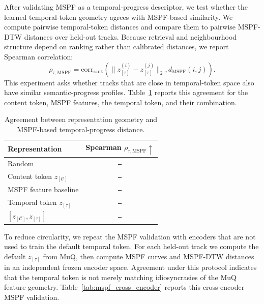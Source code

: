 \documentclass{article}
\newcommand{\zC}{z_{[\mathcal{C}]}}    %
\newcommand{\ztau}{z_{[\tau]}}          %
\newcommand{\res}{\texttt{--}}
\begin{document}
After validating MSPF as a temporal-progress descriptor, we test
whether the learned temporal-token geometry agrees with MSPF-based
similarity.  We compute pairwise temporal-token distances and
compare them to pairwise MSPF-DTW distances over held-out tracks.
Because retrieval and neighbourhood structure depend on ranking
rather than calibrated distances, we report Spearman correlation:
%
\begin{equation}
  \rho_{\tau,\mathrm{MSPF}}
  =
  \mathrm{corr}_{\mathrm{rank}}
  \left(
    \|\ztau^{(i)}-\ztau^{(j)}\|_2,
    d_{\mathrm{MSPF}}(i,j)
  \right).
  \label{eq:mspf_geometry}
\end{equation}
%
This experiment asks whether tracks that are close in temporal-token
space also have similar semantic-progress profiles.
Table~\ref{tab:mspf_geometry} reports this agreement for the
content token, MSPF features, the temporal token, and their
combination.

\begin{table}[t]
  \centering
  \setlength{\tabcolsep}{5.0pt}
  \caption{Agreement between representation geometry and MSPF-based
  temporal-progress distance.}
  \label{tab:mspf_geometry}
  \begin{tabular}{lc}
    \toprule
    \textbf{Representation}
    & Spearman $\rho_{\tau,\mathrm{MSPF}}\uparrow$ \\
    \midrule
    Random & \res \\
    Content token $\zC$ & \res \\
    MSPF feature baseline & \res \\
    Temporal token $\ztau$ & \res \\
    $[\zC,\ztau]$ & \res \\
    \bottomrule
  \end{tabular}
\end{table}

To reduce circularity, we repeat the MSPF validation with encoders
that are not used to train the default temporal token.  For each
held-out track we compute the default $\ztau$ from MuQ, then compute
MSPF curves and MSPF-DTW distances in an independent frozen encoder
space.  Agreement under this protocol indicates that the temporal
token is not merely matching idiosyncrasies of the MuQ feature
geometry.  Table~\ref{tab:mspf_cross_encoder} reports this
cross-encoder MSPF validation.
\end{document}
